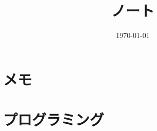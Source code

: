 \documentclass[6pt]{jreport}
\title{ノート}
\author{}
\date{\today}
\begin{document}
\maketitle
\tableofcontents

\chapter{メモ}

\chapter{プログラミング}

%
%



\end{document}
